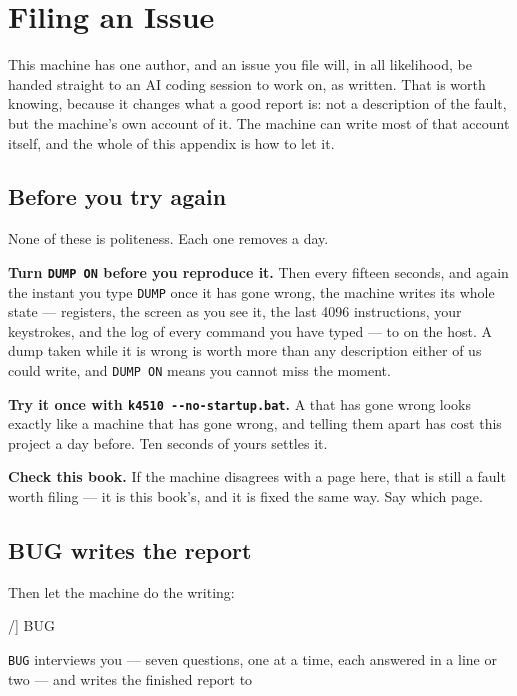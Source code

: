 \chapter{Filing an Issue}\label{cha:issues}

This machine has one author, and an issue you file will, in all
likelihood, be handed straight to an AI coding session to work on, as
written. That is worth knowing, because it changes what a good report
is: not a description of the fault, but the machine's own account of it.
The machine can write most of that account itself, and the whole of this
appendix is how to let it.

\section{Before you try again}
None of these is politeness. Each one removes a day.

\textbf{Turn \texttt{DUMP ON} before you reproduce it.} Then every
fifteen seconds, and again the instant you type \verb|DUMP| once it has
gone wrong, the machine writes its whole state --- registers, the screen
as you see it, the last 4096 instructions, your keystrokes, and the log
of every command you have typed --- to  on the
host. A dump taken while it is wrong is worth more than any description
either of us could write, and \verb|DUMP ON| means you cannot miss the
moment.

\textbf{Try it once with \texttt{k4510 {-}{-}no-startup.bat}.} A
 that has gone wrong looks exactly like a machine that
has gone wrong, and telling them apart has cost this project a day
before. Ten seconds of yours settles it.

\textbf{Check this book.} If the machine disagrees with a page here, that
is still a fault worth filing --- it is this book's, and it is fixed the
same way. Say which page.

\section{BUG writes the report}
Then let the machine do the writing:

\begin{type}
/] BUG
\end{type}

\noindent \verb|BUG| interviews you --- seven questions, one at a time,
each answered in a line or two --- and writes the finished report to

